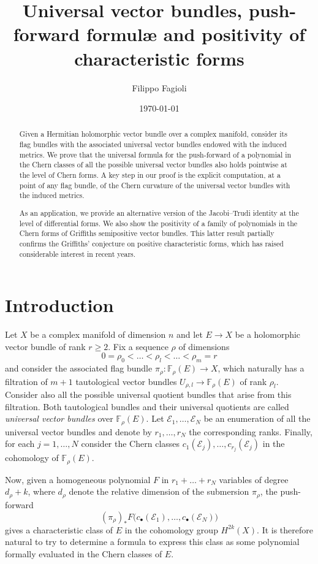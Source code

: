 \documentclass[a4paper]{amsart}
\title[Universal vector bundles, push-forward formul{\ae} and positivity]{Universal vector bundles, push-forward formul{\ae} and positivity of characteristic forms}
\author{Filippo Fagioli}
\date{\today}
\theoremstyle{plain}%
\theoremstyle{definition}
\theoremstyle{remark}
\newcommand{\FF}{\mathbb{F}}
\begin{document}
\begin{abstract}
	Given a Hermitian holomorphic vector bundle over a complex manifold, consider its flag bundles with the associated universal vector bundles endowed with the induced metrics.
	We prove that the universal formula for the push-forward of a polynomial in the Chern classes of all the possible universal vector bundles also holds pointwise at the level of Chern forms.
	A key step in our proof is the explicit computation, at a point of any flag bundle, of the Chern curvature of the universal vector bundles with the induced metrics.
	
	As an application, we provide an alternative version of the Jacobi--Trudi identity at the level of differential forms.
	We also show the positivity of a family of polynomials in the Chern forms of Griffiths semipositive vector bundles.
	This latter result partially confirms the Griffiths' conjecture on positive characteristic forms, which has raised considerable interest in recent years.
\end{abstract}

\maketitle

\section*{Introduction}
	Let $ X $ be a complex manifold of dimension $ n $ and let $ E \to X $ be a holomorphic vector bundle of rank $ r \ge 2 $.
	Fix a sequence $ \rho $ of dimensions
	$$ 0 = \rho_0 < \dots < \rho_l < \dots < \rho_{m} = r $$
	and consider the associated flag bundle $ \pi_{\rho} \colon \FF_{\rho}(E) \to X $, which naturally has a filtration of $ m+1 $ tautological vector bundles $ U_{\rho,l} \to \FF_{\rho}(E) $ of rank $ \rho_{l} $.
	Consider also all the possible universal quotient bundles that arise from this filtration.
	Both tautological bundles and their universal quotients are called \emph{universal vector bundles} over $ \FF_{\rho}(E) $.
	Let $ \mathcal{E}_1, \dots, \mathcal{E}_N $ be an enumeration of all the universal vector bundles and denote by $ r_1, \dots, r_N $ the corresponding ranks.
	Finally, for each $ j = 1, \dots, N $ consider the Chern classes $ c_{1}(\mathcal{E}_j) , \dots, c_{r_j}(\mathcal{E}_j) $ in the cohomology of $ \FF_{\rho}(E) $. 
	
	Now, given a homogeneous polynomial $ F $ in $ r_1 + \dots + r_N $ variables of degree $ d_\rho + k $, where $ d_\rho $ denote the relative dimension of the submersion $ \pi_{\rho} $, the push-forward 
	\[
	(\pi_{\rho})_{*} F \bigl( c_{\bullet}(\mathcal{E}_{1}),\dots,c_{\bullet}(\mathcal{E}_{N}) \bigr)
	\] 
	gives a characteristic class of $ E $ in the cohomology group $ H^{2k}(X) $.
	It is therefore natural to try to determine a formula to express this class as some polynomial formally evaluated in the Chern classes of $ E $.
	
\end{document}

